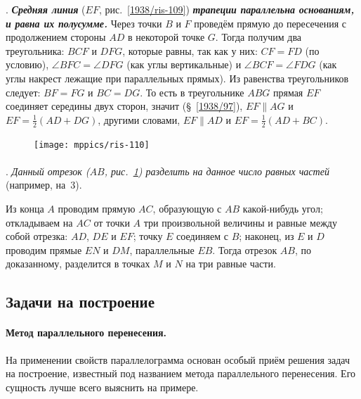 \documentclass[oneside]{book}
\begin{document}
\smallskip
\mbox{.}
\textbf{\emph{Средняя линия}} ($EF$, рис.~\ref{1938/ris-109}) \textbf{\emph{трапеции параллельна основаниям, и равна их полусумме.}}
Через точки $B$ и $F$ проведём прямую до пересечения с продолжением стороны $AD$ в некоторой точке $G$.
Тогда получим два треугольника:
$BCF$ и $DFG$, которые равны, так как у них:
$CF=FD$ (по условию), $\angle BFC=\angle DFG$ (как углы вертикальные) и $\angle BCF = \angle FDG$ (как углы накрест лежащие при параллельных прямых).
Из равенства треугольников следует:
$BF=FG$ и $BC=DG$.
То есть в треугольнике $ABG$ прямая $EF$ соединяет середины двух сторон, значит (§~\ref{1938/97}), $EF \parallel AG$ и $EF = \tfrac12(AD+DG)$, другими словами, $EF\parallel AD$ и $EF = \tfrac12(AD + BC)$.

\begin{figure}
\vskip-7mm
\centering
\texttt{[image: mppics/ris-110]}
\caption{}\label{1938/ris-110}
\end{figure}

\paragraph{}\label{1938/100}
\mbox{.}
\emph{Данный отрезок \emph{($AB$, рис.~\ref{1938/ris-110})} разделить на данное число равных частей} (например, на~3).

Из конца $A$ проводим прямую $AC$, образующую с $AB$ какой-нибудь угол;
откладываем на $AC$ от точки $A$ три произвольной величины и равные между собой отрезка:
$AD$, $DE$ и $EF$;
точку $E$ соединяем с $B$;
наконец, из $E$ и $D$ проводим прямые $EN$ и $DM$, параллельные $EB$.
Тогда отрезок $AB$, по доказанному, разделится в точках $M$ и $N$ на три равные части.

\subsection*{Задачи на построение}

{\sloppy 

\paragraph{Метод параллельного перенесения.}\label{1938/101}
На применении свойств параллелограмма основан особый приём решения задач на построение, известный под названием метода параллельного перенесения.
Его сущность лучше всего выяснить на примере.

}
\end{document}
